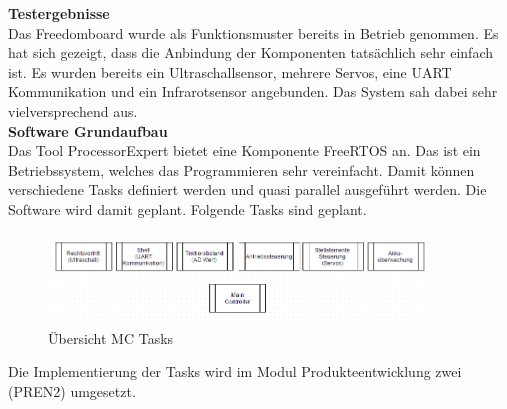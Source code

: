\textbf{Testergebnisse}\\[0.2cm]
Das Freedomboard wurde als Funktionsmuster bereits in Betrieb genommen. Es hat sich gezeigt, dass die Anbindung der Komponenten tatsächlich sehr einfach ist. Es wurden bereits ein Ultraschallsensor, mehrere Servos, eine UART Kommunikation und ein Infrarotsensor angebunden. Das System sah dabei sehr vielversprechend aus.\\[0.2cm]
\textbf{Software Grundaufbau}\\[0.2cm]
Das Tool ProcessorExpert bietet eine Komponente FreeRTOS an. Das ist ein Betriebssystem, welches das Programmieren sehr vereinfacht. Damit können verschiedene Tasks definiert werden und quasi parallel ausgeführt werden. Die Software wird damit geplant. Folgende Tasks sind geplant.
\begin{figure}[H]
	\centering
	\includegraphics[width=0.9\textwidth]{03_Loesungskonzept/pictures/MC_Tasks.png}
	\caption{Übersicht MC Tasks}
\end{figure}\flushleft
Die Implementierung der Tasks wird im Modul Produkteentwicklung zwei (PREN2) umgesetzt.